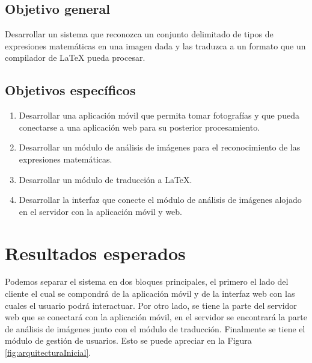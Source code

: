 \subsection{Objetivo general}
Desarrollar un sistema que reconozca un conjunto delimitado de tipos de expresiones matemáticas en una imagen dada y las traduzca a un formato que un compilador de LaTeX pueda procesar.
\subsection{Objetivos específicos}
\begin{enumerate}
	\item Desarrollar una aplicación móvil que permita tomar fotografías y que pueda conectarse a una aplicación web para su posterior procesamiento.
	\item Desarrollar un módulo de análisis de imágenes para el reconocimiento de las expresiones matemáticas.
	\item Desarrollar un módulo de traducción a LaTeX.
	\item Desarrollar la interfaz que conecte el módulo de análisis de imágenes alojado en el servidor con la aplicación móvil y web.
\end{enumerate}


\section{Resultados esperados}
Podemos separar el sistema en dos bloques principales, el primero el lado del cliente el cual se compondrá de la aplicación móvil y de la interfaz web con las cuales el usuario podrá interactuar. Por otro lado, se tiene la parte del servidor web que se conectará con la aplicación móvil, en el servidor se encontrará la parte de análisis de imágenes junto con el módulo de traducción. Finalmente se tiene el módulo de gestión de usuarios. Esto se puede apreciar en la Figura \ref{fig:arquitecturaInicial}.%


